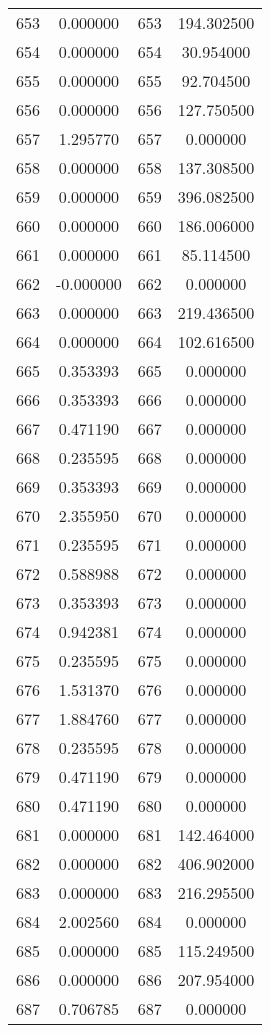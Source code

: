 \documentclass[12pt]{article}
\begin{document}
\begin{longtable}{@{}cccc@{}}
653 & 0.000000 & 653 & 194.302500 \\
654 & 0.000000 & 654 & 30.954000 \\
655 & 0.000000 & 655 & 92.704500 \\
656 & 0.000000 & 656 & 127.750500 \\
657 & 1.295770 & 657 & 0.000000 \\
658 & 0.000000 & 658 & 137.308500 \\
659 & 0.000000 & 659 & 396.082500 \\
660 & 0.000000 & 660 & 186.006000 \\
661 & 0.000000 & 661 & 85.114500 \\
662 & -0.000000 & 662 & 0.000000 \\
663 & 0.000000 & 663 & 219.436500 \\
664 & 0.000000 & 664 & 102.616500 \\
665 & 0.353393 & 665 & 0.000000 \\
666 & 0.353393 & 666 & 0.000000 \\
667 & 0.471190 & 667 & 0.000000 \\
668 & 0.235595 & 668 & 0.000000 \\
669 & 0.353393 & 669 & 0.000000 \\
670 & 2.355950 & 670 & 0.000000 \\
671 & 0.235595 & 671 & 0.000000 \\
672 & 0.588988 & 672 & 0.000000 \\
673 & 0.353393 & 673 & 0.000000 \\
674 & 0.942381 & 674 & 0.000000 \\
675 & 0.235595 & 675 & 0.000000 \\
676 & 1.531370 & 676 & 0.000000 \\
677 & 1.884760 & 677 & 0.000000 \\
678 & 0.235595 & 678 & 0.000000 \\
679 & 0.471190 & 679 & 0.000000 \\
680 & 0.471190 & 680 & 0.000000 \\
681 & 0.000000 & 681 & 142.464000 \\
682 & 0.000000 & 682 & 406.902000 \\
683 & 0.000000 & 683 & 216.295500 \\
684 & 2.002560 & 684 & 0.000000 \\
685 & 0.000000 & 685 & 115.249500 \\
686 & 0.000000 & 686 & 207.954000 \\
687 & 0.706785 & 687 & 0.000000 \\

\end{longtable}
\end{document}
